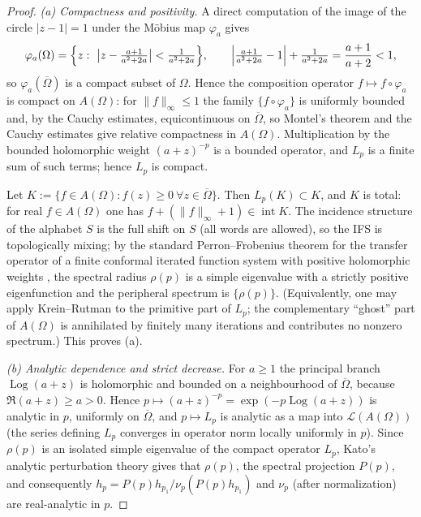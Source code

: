 \begin{proof}
\emph{(a) Compactness and positivity.}
A direct computation of the image of the circle $|z-1|=1$ under the M\"obius map
$\varphi_a$ gives
\[
\varphi_a(\Omega)=\Bigl\{z:\ \bigl|z-\tfrac{a+1}{a^2+2a}\bigr|<\tfrac{1}{a^2+2a}\Bigr\},
\qquad
\Bigl|\tfrac{a+1}{a^2+2a}-1\Bigr|+\tfrac{1}{a^2+2a}=\frac{a+1}{a+2}<1 ,
\]
so $\varphi_a(\overline\Omega)$ is a compact subset of $\Omega$. Hence the
composition operator $f\mapsto f\circ\varphi_a$ is compact on $A(\Omega)$: for
$\|f\|_\infty\le1$ the family $\{f\circ\varphi_a\}$ is uniformly bounded and,
by the Cauchy estimates, equicontinuous on $\overline\Omega$, so Montel's theorem
and the Cauchy estimates give relative compactness in $A(\Omega)$. Multiplication
by the bounded holomorphic weight $(a+z)^{-p}$ is a bounded operator, and $L_p$ is
a finite sum of such terms; hence $L_p$ is compact.

Let $K:=\{f\in A(\Omega): f(z)\ge0\ \forall z\in\overline\Omega\}$. Then
$L_p(K)\subset K$, and $K$ is total: for real $f\in A(\Omega)$ one has
$f+(\|f\|_\infty+1)\in\operatorname{int}K$. The incidence structure of the
alphabet $S$ is the full shift on $S$ (all words are allowed), so the IFS is
topologically mixing; by the standard Perron--Frobenius theorem for the transfer
operator of a finite conformal iterated function system with positive
holomorphic weights \cite{Mayer1991,JenkinsonPollicott2018}, the spectral radius
$\rho(p)$ is a simple eigenvalue with a strictly positive eigenfunction and the
peripheral spectrum is $\{\rho(p)\}$. (Equivalently, one may apply
Krein--Rutman to the primitive part of $L_p$; the complementary ``ghost'' part
of $A(\Omega)$ is annihilated by finitely many iterations and contributes no
nonzero spectrum.) This proves (a).

\emph{(b) Analytic dependence and strict decrease.}
For $a\ge1$ the principal branch $\operatorname{Log}(a+z)$ is holomorphic and bounded on a
neighbourhood of $\overline\Omega$, because $\Re(a+z)\ge a>0$. Hence
$p\mapsto(a+z)^{-p}=\exp(-p\operatorname{Log}(a+z))$ is analytic in $p$, uniformly on
$\overline\Omega$, and $p\mapsto L_p$ is analytic as a map into
$\mathcal L(A(\Omega))$ (the series defining $L_p$ converges in operator norm
locally uniformly in $p$). Since $\rho(p)$ is an isolated simple eigenvalue of
the compact operator $L_p$, Kato's analytic perturbation theory
\cite[Chapter~VII]{Kato1976} gives that $\rho(p)$, the spectral projection
$P(p)$, and consequently $h_p=P(p)h_{p_1}/\nu_p(P(p)h_{p_1})$ and $\nu_p$ (after
normalization) are real-analytic in $p$.


\end{proof}
